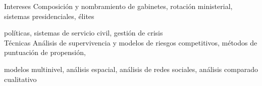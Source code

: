 





\begin{cvskills}

\cvskill
{Intereses}
{Composición y nombramiento de gabinetes, rotación ministerial, sistemas presidenciales, élites}

\cvskill
{}
{políticas, sistemas de servicio civil, gestión de crisis}\\

\cvskill
{Técnicas} 
{Análisis de supervivencia y modelos de riesgos competitivos, métodos de puntuación de propensión,}

\cvskill
{} 
{modelos multinivel, análisis espacial, análisis de redes sociales, análisis comparado cualitativo} \\

\end{cvskills}

